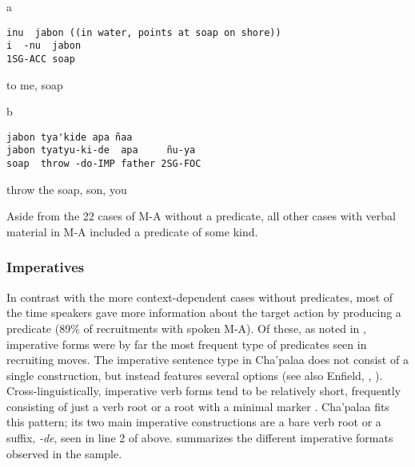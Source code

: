 \documentclass[output=paper]{langsci/langscibook}
\begin{document}
\vspace{-1mm}
%
\begin{mdframednoverticalspace}[style=firstfoc]
\begin{transbox}{1}{a}
\begin{verbatim}
inu  jabon ((in water, points at soap on shore))
i  -nu  jabon
1SG-ACC soap
\end{verbatim}
to me, soap
\end{transbox}
\end{mdframednoverticalspace}
%
\begin{mdframednoverticalspace}[style=secondfoc]
\begin{transbox}{2}{b}
\begin{verbatim}
jabon tya'kide apa ñaa
jabon tyatyu-ki-de  apa     ñu-ya
soap  throw -do-IMP father 2SG-FOC
\end{verbatim}
throw the soap, son, you
\end{transbox}
\end{mdframednoverticalspace}
%
\vspace{-2mm}
%

\normalsize
Aside from the 22 cases of M-A without a predicate, all other cases with verbal material in M-A included a predicate of some kind.

\subsubsection{Imperatives}\label{sec:floyd:3.3.2}

In contrast with the more context-dependent cases without predicates, most of the time speakers gave more information about the target action by producing a predicate (89\% of recruitments with spoken M-A). Of these, as noted in , imperative forms were by far the most frequent type of predicates seen in recruiting moves. The imperative sentence type in Cha'palaa does not consist of a single construction, but instead features several options (see also Enfield, , ). Cross-linguistically, imperative verb forms tend to be relatively short, frequently consisting of just a verb root or a root with a minimal marker \citep{Khrakovskij2001,aikhenvald2010}. Cha'palaa fits this pattern; its two main imperative constructions are a bare verb root or a suffix, \textit{-de}, seen in line 2 of  above.  summarizes the different imperative formats observed in the sample.
\end{document}
